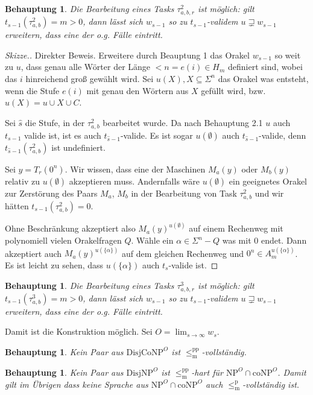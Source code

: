 \documentclass[nofonts]{uebung}
\newtheorem{claim}[theorem]{Behauptung}
\theoremstyle{definition}
\def\NP{\ensuremath{\mathrm{NP}}}
\def\DisjNP{\ensuremath{\mathrm{DisjNP}}}
\def\DisjCoNP{\ensuremath{\mathrm{DisjCoNP}}}
\def\coNP{\ensuremath{\mathrm{coNP}}}
\def\leqmpp{\ensuremath{\leq_\mathrm{m}^\mathrm{pp}}}
\def\leqmp{\ensuremath{\leq_\mathrm{m}^\mathrm{p}}}
\begin{document}
\begin{claim}
    Die Bearbeitung eines Tasks $\tau^2_{a,b,r}$ ist möglich: gilt $t_{s-1}(\tau^2_{a,b})=m>0$, dann lässt sich $w_{s-1}$ so zu $t_{s-1}$-validem $u\sqsupsetneq w_{s-1}$ erweitern, dass eine der o.g. Fälle eintritt.
\end{claim}
\begin{proof}[Skizze.]
    Direkter Beweis. %
    Erweitere durch Beauptung 1 das Orakel $w_{s-1}$ so weit zu $u$, dass genau alle Wörter der Länge $<n=e(i)\in H_m$ definiert sind, wobei das $i$ hinreichend groß gewählt wird. Sei $u(X), X\subseteq \Sigma^n$ das Orakel was entsteht, wenn die Stufe $e(i)$ mit genau den Wörtern aus $X$ gefüllt wird, bzw. $u(X)=u\cup X\cup C$.

    Sei $\hat{s}$ die Stufe, in der $\tau^2_{a,b}$ bearbeitet wurde.
    Da nach Behauptung 2.1 $u$ auch $t_{s-1}$ valide ist, ist es auch $t_{\hat{s}-1}$-valide.
    Es ist sogar $u(\emptyset)$ auch $t_{\hat{s}-1}$-valide, denn $t_{\hat{s}-1}(\tau^2_{a,b})$ ist undefiniert.

    Sei $y=T_r(0^n)$.
    Wir wissen, dass eine der Maschinen $M_a(y)$ oder $M_b(y)$ relativ zu $u(\emptyset)$ akzeptieren muss.
    Andernfalls wäre $u(\emptyset)$ ein geeignetes Orakel zur Zerstörung des Paars $M_a$, $M_b$ in der Bearbeitung von Task $\tau^2_{a,b}$ und wir hätten $t_{s-1}(\tau^2_{a,b})=0$.

    Ohne Beschränkung akzeptiert also $M_a(y)^{u(\emptyset)}$ auf einem Rechenweg mit polynomiell vielen Orakelfragen $Q$.
    Wähle ein $\alpha\in \Sigma^n-Q$ was mit $0$ endet. Dann akzeptiert auch $M_a(y)^{u(\{\alpha\})}$ auf dem gleichen Rechenweg und $0^n\in A_m^{u(\{\alpha\})}$. Es ist leicht zu sehen, dass $u(\{\alpha\})$ auch $t_{s}$-valide ist.
\end{proof}

\begin{claim}
    Die Bearbeitung eines Tasks $\tau^3_{a,b,r}$ ist möglich: gilt $t_{s-1}(\tau^3_{a,b})=m>0$, dann lässt sich $w_{s-1}$ so zu $t_{s-1}$-validem $u\sqsupsetneq w_{s-1}$ erweitern, dass eine der o.g. Fälle eintritt.
\end{claim}

Damit ist die Konstruktion möglich. Sei $O=\lim_{s\to\infty} w_s$.

\begin{claim}
    Kein Paar aus $\DisjCoNP^O$ ist $\leqmpp$-vollständig.
\end{claim}
\begin{claim}
    Kein Paar aus $\DisjNP^O$ ist $\leqmpp$-hart für $\NP^O\cap\coNP^O$.
    Damit gilt im Übrigen dass keine Sprache aus $\NP^O\cap\coNP^O$ auch $\leqmp$-vollständig ist.
\end{claim}
\end{document}
